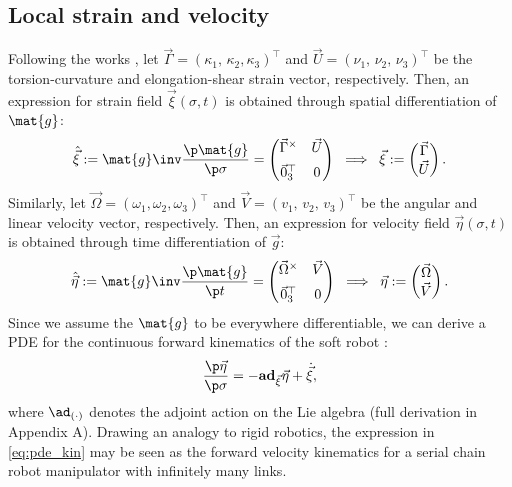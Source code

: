 \subsection{Local strain and velocity}
Following the works \cite{Renda2018,Renda2020,Boyer2021}, let $\vec{\Gamma} = (\kappa_1,\, \kappa_2, \kappa_3)^\top$ and $\vec{U} = (\nu_1,\, \nu_2,\, \nu_3)^\top$ be the torsion-curvature and elongation-shear strain vector, respectively. Then, an expression for strain field $\vec{\xi}(\sigma,t)$ is obtained through spatial differentiation of $\mat{g}$:
%
\begin{equation}
\hat{\vec{\xi}} := \mat{g}\inv \frac{\p \mat{g}}{\p \sigma} = \begin{pmatrix} \vec{\Gamma}^\times & \vec{U} \\[0.5em] \vec{0}_3^\top & 0 \end{pmatrix} \;\; \Longrightarrow \;\; \vec{\xi} := \begin{pmatrix} \vec{\Gamma} \\ \vec{U} \end{pmatrix}.
\label{eq:xi}
\end{equation}
%
Similarly, let $\vec{\Omega} = (\omega_1, \omega_2, \omega_3)^\top$ and $\vec{V} = (v_1,\,v_2,\, v_3)^\top$ be the angular and linear velocity vector, respectively. Then, an expression for velocity field $\vec{\eta}(\sigma,t)$ is obtained through time differentiation of $\vec{g}$:
%
\begin{equation}
\hat{\vec{\eta}} := \mat{g}\inv \frac{\p \mat{g}}{\p t} = \begin{pmatrix} \vec{\Omega}^\times & \vec{V} \\[0.5em] \vec{0}_3^\top & 0 \end{pmatrix} \;\; \Longrightarrow \;\; \vec{\eta} := \begin{pmatrix} \vec{\Omega} \\ \vec{V} \end{pmatrix}.
\end{equation}
%
Since we assume the $\mat{g}$ to be everywhere differentiable, we can derive a PDE for the continuous forward kinematics of the soft robot \cite{Boyer2021,Renda2020}:
%
\begin{equation}
\dfrac{\p \vec{\eta}}{\p \sigma} = -\textbf{ad}_{\vec{\xi}} \vec{\eta} + \dot{\vec{\xi}},
\label{eq:pde_kin}
\end{equation}
%
where $\ad_{(\cdot)}$ denotes the adjoint action on the Lie algebra (full derivation in Appendix A). Drawing an analogy to rigid robotics, the expression in \eqref{eq:pde_kin} may be seen as the forward velocity kinematics for a serial chain robot manipulator with infinitely many links.

